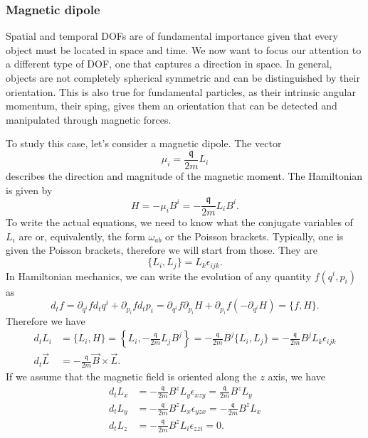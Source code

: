 \subsubsection{Magnetic dipole}

Spatial and temporal DOFs are of fundamental importance given that every object must be located in space and time. We now want to focus our attention to a different type of DOF, one that captures a direction in space. In general, objects are not completely spherical symmetric and can be distinguished by their orientation. This is also true for fundamental particles, as their intrinsic angular momentum, their sping, gives them an orientation that can be detected and manipulated through magnetic forces.

To study this case, let's consider a magnetic dipole. The vector
\begin{equation}
	\mu_i = \frac{\mathfrak{q}}{2m} L_i
\end{equation}
describes the direction and magnitude of the magnetic moment. The Hamiltonian is given by
\begin{equation}
	H = - \mu_i B^i = - \frac{\mathfrak{q}}{2m} L_i B^i.
\end{equation}
To write the actual equations, we need to know what the conjugate variables of $L_i$ are or, equivalently, the form $\omega_{ab}$ or the Poisson brackets. Typically, one is given the Poisson brackets, therefore we will start from those. They are
\begin{equation}
	\{L_i, L_j\} = L_k \epsilon_{ijk}.
\end{equation}
In Hamiltonian mechanics, we can write the evolution of any quantity $f(q^i, p_i)$ as
\begin{equation}
	d_t f = \partial_{q^i} f d_t q^i + \partial_{p_i} f d_t p_i = \partial_{q^i} f \partial_{p_i} H + \partial_{p_i} f (-\partial_{q^i} H) = \{f, H\}.
\end{equation}
Therefore we have
\begin{equation}
	\begin{aligned}
	d_t L_i &= \{L_i, H\} = \left\{ L_i, - \frac{\mathfrak{q}}{2m} L_j B^j \right\}  = - \frac{\mathfrak{q}}{2m} B^j\{L_i, L_j\} = - \frac{\mathfrak{q}}{2m} B^j L_k \epsilon_{ijk}\\
	d_t \vec{L} &= - \frac{\mathfrak{q}}{2m} \vec{B} \times \vec{L} .
	\end{aligned}
\end{equation}
If we assume that the magnetic field is oriented along the $z$ axis, we have
\begin{equation}
	\begin{aligned}
		d_t L_x &= - \frac{\mathfrak{q}}{2m} B^z L_y \epsilon_{xzy} = \frac{\mathfrak{q}}{2m} B^z L_y \\
		d_t L_y &= - \frac{\mathfrak{q}}{2m} B^z L_x \epsilon_{yzx} = - \frac{\mathfrak{q}}{2m} B^z L_x \\
		d_t L_z &= - \frac{\mathfrak{q}}{2m} B^z L_i \epsilon_{zzi} = 0.
	\end{aligned}
\end{equation}
